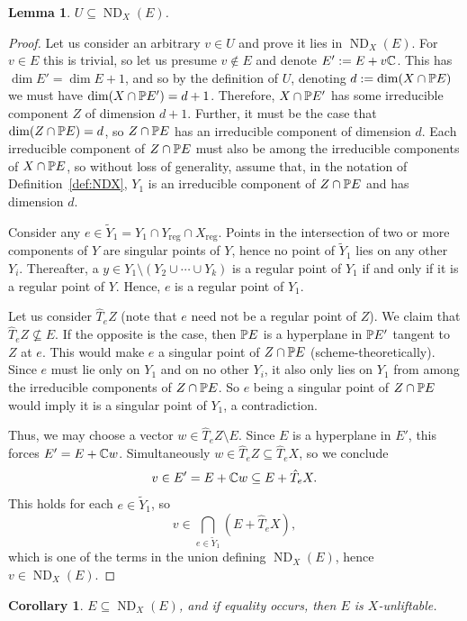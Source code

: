 \documentclass[a4paper,10pt]{article}
\def\reg{\text{reg}}
\DeclareMathOperator{\ND}{ND}
\newtheorem{lemma}[theorem]{Lemma}
\newtheorem{corollary}[theorem]{Corollary}
\theoremstyle{definition}
\theoremstyle{remark}
\begin{document}
\begin{lemma}
    \label{lem:general}
    $U\subseteq \ND_X(E)$.
\end{lemma}
\begin{proof}
    Let us consider an arbitrary $v\in U$ and prove it lies in $\ND_X(E)$. For $v\in E$ this is trivial, so let us presume $v\notin E$ and denote $E':= E+v\ce$. This has $\dim E' = \dim E+1$, and so by the definition of $U$, denoting $d:=\dim(X\cap \pe E)$ we must have $\dim(X\cap \pe E') = d+1$. Therefore, $X\cap \pe E'$ has some irreducible component $Z$ of dimension $d+1$. Further, it must be the case that $\dim(Z\cap \pe E) = d$, so $Z\cap \pe E$ has an irreducible component of dimension $d$. Each irreducible component of $Z\cap \pe E$ must also be among the irreducible components of $X\cap \pe E$, so without loss of generality, assume that, in the notation of Definition~\ref{def:NDX}, $Y_1$ is an irreducible component of $Z\cap\pe E$ and has dimension $d$.

    Consider any $e\in \tilde Y_1 = Y_1\cap Y_\reg\cap X_\reg$. Points in the intersection of two or more components of $Y$ are singular points of $Y$, hence no point of $\tilde Y_1$ lies on any other $Y_i$. Thereafter, a $y\in Y_1\setminus (Y_2\cup\cdots\cup Y_k)$ is a regular point of $Y_1$ if and only if it is a regular point of $Y$. Hence, $e$ is a regular point of $Y_1$.

    Let us consider $\hat T_e Z$ (note that $e$ need not be a regular point of $Z$). We claim that $\hat T_eZ\nsubseteq E$. If the opposite is the case, then $\pe E$ is a hyperplane in $\pe E'$ tangent to $Z$ at $e$. This would make $e$ a singular point of $Z\cap \pe E$ (scheme-theoretically). Since $e$ must lie only on $Y_1$ and on no other $Y_i$, it also only lies on $Y_1$ from among the irreducible components of $Z\cap \pe E$. So $e$ being a singular point of $Z\cap \pe E$ would imply it is a singular point of $Y_1$, a contradiction.

    Thus, we may choose a vector $w\in \hat T_e Z\setminus E$. Since $E$ is a hyperplane in $E'$, this forces $E' = E+\ce w$. Simultaneously $w\in\hat T_e Z \subseteq \hat T_e X$, so we conclude
    \[
        v \in E' = E+\ce w \subseteq E+\hat T_e X.
    \]
    This holds for each $e\in \tilde Y_1$, so
    \[
        v \in \bigcap_{e\in \tilde Y_1}(E+\hat T_e X),
    \]
    which is one of the terms in the union defining $\ND_X(E)$, hence $v\in \ND_X(E)$.
\end{proof}


\begin{corollary}
    \label{cor:criterion}
    $E\subseteq \ND_X(E)$, and if equality occurs, then $E$ is $X$-unliftable.
\end{corollary}
\end{document}
